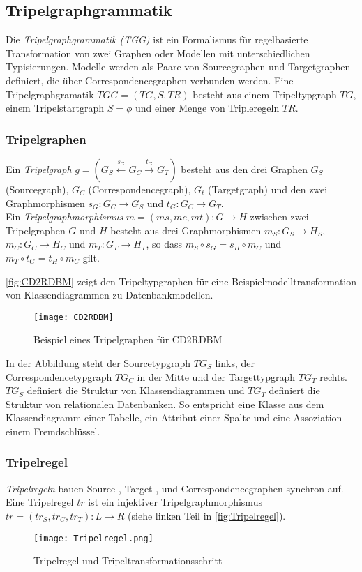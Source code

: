 \subsection{Tripelgraphgrammatik}\label{subsec:Tripelgraphgrammatik}
Die \emph{Tripelgraphgrammatik (TGG)} ist ein Formalismus für regelbasierte Transformation von zwei Graphen oder Modellen mit unterschiedlichen Typisierungen. Modelle werden als Paare von Sourcegraphen und Targetgraphen definiert, die über Correspondencegraphen verbunden werden.
Eine Tripelgraphgramatik $TGG = (TG, S, TR)$ besteht aus einem Tripeltypgraph $TG$, einem Tripelstartgraph $S = \phi$ und einer Menge von Tripleregeln $TR$.

\subsubsection{Tripelgraphen}
Ein \emph{Tripelgraph} $g=(G_S \stackrel{s_G}{\longleftarrow} G_C \stackrel{t_G}{\longrightarrow} G_T)$ besteht aus den drei Graphen $G_S$ (Sourcegraph), $G_C$ (Correspondencegraph), $G_t$ (Targetgraph) und den zwei Graphmorphismen $s_G:G_C \to G_S$ und $t_G: G_C \to G_T$. \\
Ein \emph{Tripelgraphmorphismus} $m =(ms, mc, mt):G \to H$ zwischen zwei Tripelgraphen $G$ und $H$ besteht aus drei Graphmorphismen $m_S: G_S \to H_S$, $m_C: G_C \to H_C$ und $m_T: G_T \to H_T$, so dass $m_S \circ s_G = s_H \circ m_C$ und $m_T \circ t_G = t_H \circ m_C$ gilt.

\autoref{fig:CD2RDBM} zeigt den Tripeltypgraphen für eine Beispielmodelltransformation von Klassendiagrammen zu Datenbankmodellen.

\begin{figure}%
	\centering
	\texttt{[image: CD2RDBM]}
	\caption{Beispiel eines Tripelgraphen für CD2RDBM}
	\label{fig:CD2RDBM}
\end{figure}

In der Abbildung steht der Sourcetypgraph $TG_S$ links, der Correspondencetypgraph $TG_C$ in der Mitte und der Targettypgraph $TG_T$ rechts. $TG_S$ definiert die Struktur von Klassendiagrammen und $TG_T$ definiert die Struktur von relationalen Datenbanken. So entspricht eine Klasse aus dem Klassendiagramm einer Tabelle, ein Attribut einer Spalte und eine Assoziation einem Fremdschlüssel.

\subsubsection{Tripelregel}
\emph{Tripelregeln} bauen Source-, Target-, und Correspondencegraphen synchron auf.
Eine Tripelregel $tr$ ist ein injektiver Tripelgraphmorphismus $tr = (tr_S, tr_C, tr_T): L \to R$ (siehe linken Teil in \autoref{fig:Tripelregel}).
\begin{figure}[h!] %
	\centering
	\texttt{[image: Tripelregel.png]}
	\caption{Tripelregel und Tripeltransformationsschritt}
	\label{fig:Tripelregel}
\end{figure}


